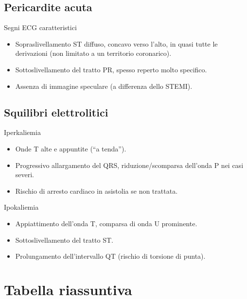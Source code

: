 \documentclass[11pt,a4paper]{article}
\begin{document}
\subsection{Pericardite acuta}
\begin{keybox}{Segni ECG caratteristici}
\begin{itemize}[leftmargin=1.2em]
  \item Sopraslivellamento ST diffuso, concavo verso l'alto, in quasi tutte le derivazioni (non limitato a un territorio coronarico).
  \item Sottoslivellamento del tratto PR, spesso reperto molto specifico.
  \item Assenza di immagine speculare (a differenza dello STEMI).
\end{itemize}
\end{keybox}

\subsection{Squilibri elettrolitici}
\begin{keybox}{Iperkaliemia}
\begin{itemize}[leftmargin=1.2em]
  \item Onde T alte e appuntite (“a tenda”).
  \item Progressivo allargamento del QRS, riduzione/scomparsa dell'onda P nei casi severi.
  \item Rischio di arresto cardiaco in asistolia se non trattata.
\end{itemize}
\end{keybox}
\begin{keybox}{Ipokaliemia}
\begin{itemize}[leftmargin=1.2em]
  \item Appiattimento dell'onda T, comparsa di onda U prominente.
  \item Sottoslivellamento del tratto ST.
  \item Prolungamento dell'intervallo QT (rischio di torsione di punta).
\end{itemize}
\end{keybox}

\section{Tabella riassuntiva}
\end{document}
